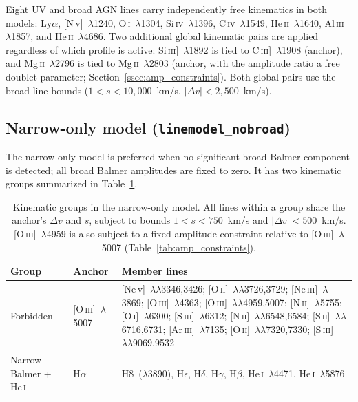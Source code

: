 \documentclass[12pt]{article}
\begin{document}
Eight UV and broad AGN lines carry independently free kinematics in both models:
Ly$\alpha$, [N\,v]~$\lambda$1240, O\,\textsc{i}~$\lambda$1304,
Si\,\textsc{iv}~$\lambda$1396, C\,\textsc{iv}~$\lambda$1549,
He\,\textsc{ii}~$\lambda$1640, Al\,\textsc{iii}~$\lambda$1857, and
He\,\textsc{ii}~$\lambda$4686.  Two additional global kinematic pairs are applied
regardless of which profile is active: Si\,\textsc{iii}]~$\lambda$1892 is tied to
C\,\textsc{iii}]~$\lambda$1908 (anchor), and Mg\,\textsc{ii}~$\lambda$2796 is tied to
Mg\,\textsc{ii}~$\lambda$2803 (anchor, with the amplitude ratio a free doublet parameter;
Section~\ref{ssec:amp_constraints}).  Both global pairs use the broad-line bounds
($1 < s < 10{,}000$~km/s, $|\Delta v| < 2{,}500$~km/s).

\subsection{Narrow-only model (\texttt{linemodel\_nobroad})}
\label{ssec:nobroad}

The narrow-only model is preferred when no significant broad Balmer component is
detected; all broad Balmer amplitudes are fixed to zero.  It has two kinematic
groups summarized in Table~\ref{tab:groups_nobroad}.

\begin{table}[h]
\centering
\renewcommand{\arraystretch}{1.5}
\begin{tabular}{@{}llp{8cm}@{}}
\toprule
Group & Anchor & Member lines \\
\midrule
Forbidden & [O\,\textsc{iii}]~$\lambda$5007
  & [Ne\,v]~$\lambda\lambda$3346,3426;
    [O\,\textsc{ii}]~$\lambda\lambda$3726,3729;
    [Ne\,\textsc{iii}]~$\lambda$3869;
    [O\,\textsc{iii}]~$\lambda$4363;
    [O\,\textsc{iii}]~$\lambda\lambda$4959,5007;
    [N\,\textsc{ii}]~$\lambda$5755;
    [O\,\textsc{i}]~$\lambda$6300;
    [S\,\textsc{iii}]~$\lambda$6312;
    [N\,\textsc{ii}]~$\lambda\lambda$6548,6584;
    [S\,\textsc{ii}]~$\lambda\lambda$6716,6731;
    [Ar\,\textsc{iii}]~$\lambda$7135;
    [O\,\textsc{ii}]~$\lambda\lambda$7320,7330;
    [S\,\textsc{iii}]~$\lambda\lambda$9069,9532 \\[4pt]
Narrow Balmer + He\,\textsc{i} & H$\alpha$
  & H8~($\lambda$3890), H$\epsilon$, H$\delta$, H$\gamma$,
    H$\beta$,
    He\,\textsc{i}~$\lambda$4471, He\,\textsc{i}~$\lambda$5876 \\
\bottomrule
\end{tabular}
\caption{Kinematic groups in the narrow-only model.  All lines within a group share
  the anchor's $\Delta v$ and $s$, subject to bounds $1 < s < 750$~km/s and
  $|\Delta v| < 500$~km/s.  [O\,\textsc{iii}]~$\lambda$4959 is also subject to a
  fixed amplitude constraint relative to [O\,\textsc{iii}]~$\lambda$5007
  (Table~\ref{tab:amp_constraints}).}
\label{tab:groups_nobroad}
\end{table}
\end{document}

